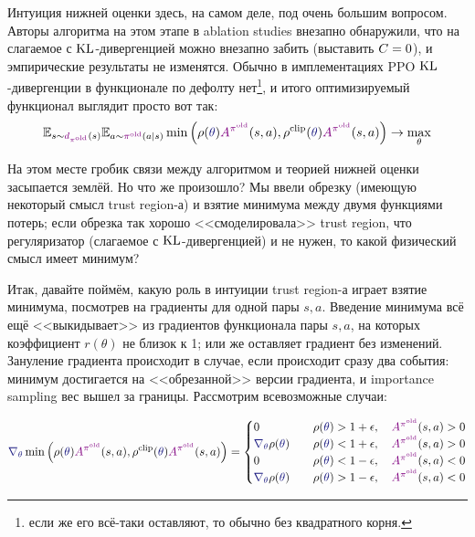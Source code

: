 Интуиция нижней оценки здесь, на самом деле, под очень большим вопросом. Авторы алгоритма на этом этапе в ablation studies внезапно обнаружили, что на слагаемое с $\operatorname{KL}$-дивергенцией можно внезапно забить (выставить $C \HM= 0$), и эмпирические результаты не изменятся. Обычно в имплементациях PPO $\operatorname{KL}$-дивергенции в функционале по дефолту нет\footnote{если же его всё-таки оставляют, то обычно без квадратного корня.}, и итого оптимизируемый функционал выглядит просто вот так:
\begin{equation}\label{PPOobjective}
\E_{s \sim \textcolor{ChadPurple}{d_{\pi^{\old}}}(s)} \E_{a \sim \textcolor{ChadPurple}{\pi^{\old}}(a \mid s)} \min \left( \rho(\textcolor{ChadBlue}{\theta}) \textcolor{ChadPurple}{A^{\pi^{\old}}}(s, a), \rho^{\clip}(\textcolor{ChadBlue}{\theta}) \textcolor{ChadPurple}{A^{\pi^{\old}}}(s, a)\right) \to \max_\theta
\end{equation}

На этом месте гробик связи между алгоритмом и теорией нижней оценки засыпается землёй. Но что же произошло? Мы ввели обрезку (имеющую некоторый смысл trust region-а) и взятие минимума между двумя функциями потерь; если обрезка так хорошо <<смоделировала>> trust region, что регуляризатор (слагаемое с $\operatorname{KL}$-дивергенцией) и не нужен, то какой физический смысл имеет минимум? 

Итак, давайте поймём, какую роль в интуиции trust region-а играет взятие минимума, посмотрев на градиенты для одной пары $s, a$. Введение минимума всё ещё <<выкидывает>> из градиентов функционала пары $s, a$, на которых коэффициент $r(\theta)$ не близок к 1; или же оставляет градиент без изменений. Зануление градиента происходит в случае, если происходит сразу два события: минимум достигается на <<обрезанной>> версии градиента, и importance sampling вес вышел за границы. Рассмотрим всевозможные случаи:

$$\textcolor{ChadBlue}{\nabla_\theta} \min \left( \rho(\textcolor{ChadBlue}{\theta}) \textcolor{ChadPurple}{A^{\pi^{\old}}}(s, a), \rho^{\clip}(\textcolor{ChadBlue}{\theta}) \textcolor{ChadPurple}{A^{\pi^{\old}}}(s, a)\right) = 
\begin{cases}
0 \qquad & \rho(\textcolor{ChadBlue}{\theta}) > 1 + \epsilon, \quad \textcolor{ChadPurple}{A^{\pi^{\old}}}(s, a) > 0 \\
\textcolor{ChadBlue}{\nabla_\theta} \rho(\textcolor{ChadBlue}{\theta}) \quad &\rho(\textcolor{ChadBlue}{\theta}) < 1 + \epsilon, \quad \textcolor{ChadPurple}{A^{\pi^{\old}}}(s, a) > 0 \\
0 \qquad & \rho(\textcolor{ChadBlue}{\theta}) < 1 - \epsilon, \quad \textcolor{ChadPurple}{A^{\pi^{\old}}}(s, a) < 0 \\
\textcolor{ChadBlue}{\nabla_\theta} \rho(\textcolor{ChadBlue}{\theta}) \quad &\rho(\textcolor{ChadBlue}{\theta}) > 1 - \epsilon, \quad \textcolor{ChadPurple}{A^{\pi^{\old}}}(s, a) < 0 \\
\end{cases}
$$

